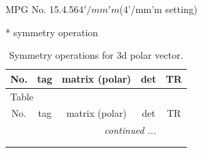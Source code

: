 \documentclass[fleqn,8pt]{jsarticle}
\begin{document}
\setcounter{MaxMatrixCols}{32}

\renewcommand{\tablename}{Table~}
\renewcommand{\figurename}{Figure~}
\begin{center}
\LARGE
MPG No. 15.4.56\quad$4'/mm'm$\quad(4'/mm'm setting)
\end{center}
* symmetry operation
\renewcommand{\arraystretch}{1.3}
\begin{longtable}{ccccc}
\caption{Symmetry operations for 3d polar vector.}
 \\
 \hline \hline
No. & tag & matrix (polar) & det & TR \\ \hline \endfirsthead

\multicolumn{4}{l}{\tablename\ \thetable{}} \\
 \hline \hline
No. & tag & matrix (polar) & det & TR \\ \hline \endhead

 \hline \hline
\multicolumn{4}{r}{\footnotesize\it continued ...} \\ \endfoot

 \hline \hline
\multicolumn{4}{r}{} \\ \endlastfoot


\end{longtable}
\end{document}
